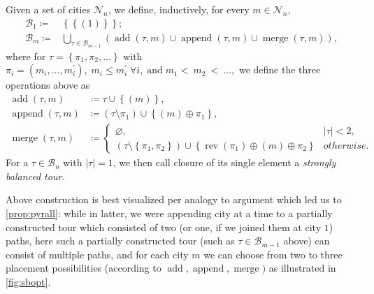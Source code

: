 \documentclass[index=totoc,bibliography=totoc]{scrartcl}
\numberwithin{equation}{section}
\numberwithin{figure}{section}
\numberwithin{table}{section}
\let\defstyle\itshape
\begin{document}
\begin{define}
\label{def:sbtour}
  Given a set of cities $\mathcal{N}_n$, we define, inductively,
  for every $m \in \mathcal{N}_n$,
  \begin{align*}
    \mathcal{B}_1 \coloneqq & \left\{ \left\{\left(1\right)\right\} \right\};
    \\
    \mathcal{B}_m \coloneqq & \bigcup_{\tau \in \mathcal{B}_{m-1}}
      \left(
      \operatorname{add}\left(\tau,m\right)
      \cup
      \operatorname{append}\left(\tau,m\right)
      \cup
      \operatorname{merge}\left(\tau,m\right)
      \right),
  \end{align*}
  where for $ \tau = \left\{ \pi_1, \pi_2, \ldots \right\} $ with
  $
    \pi_i = \left(m_i,\ldots,m_i^\prime\right), \;
    m_i \leq m_i^\prime \; \forall i, \;
    \text{and} \; m_1 <~ m_2~ <~\ldots,
  $
  we define the three operations above as
  \begin{align*}
    \operatorname{add}\left(\tau,m\right)
    & \coloneqq \tau \cup \left\{ \left(m\right) \right\},\\
    \operatorname{append}\left(\tau,m\right)
    & \coloneqq \left( \tau \setminus \pi_1 \right) \cup \left\{ \left(m\right) \oplus \pi_1 \right\},\\
    \operatorname{merge}\left(\tau,m\right)
    & \coloneqq
    \begin{cases}
      \varnothing, & \lvert\tau\rvert < 2,
      \\
      \left( \tau \setminus \left\{\pi_1,\pi_2\right\} \right)
      \cup \left\{ \operatorname{rev}\left(\pi_1\right) \oplus \left(m\right) \oplus \pi_2 \right\}
      & otherwise.
    \end{cases}
  \end{align*}
  For a $\tau \in \mathcal{B}_n$ with $\left|\tau\right| = 1$,
  we then call closure of its single element a {\defstyle strongly balanced tour}.
\end{define}

Above construction is best visualized per analogy to argument which led us
to \cref{prop:pyrall}: while in latter, we were appending city at a time to
a partially constructed tour which consisted of two (or one, if we joined
them at city $1$) paths, here such a partially constructed tour (such as
$\tau \in \mathcal{B}_{m-1}$ above) can consist of multiple paths, and for each city
$m$ we can choose from two to three placement possibilities (according to
$\operatorname{add}, \operatorname{append}, \operatorname{merge})$ as
illustrated in \cref{fig:sbopt}.
\end{document}
